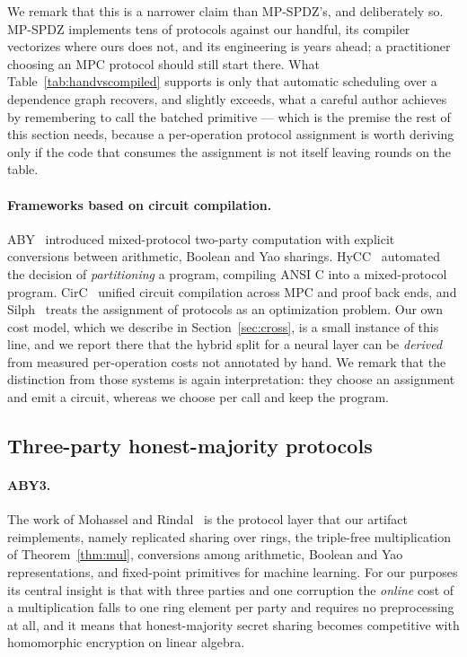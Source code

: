\documentclass[11pt]{article}
\begin{document}
We remark that this is a narrower claim than MP-SPDZ's, and deliberately so. MP-SPDZ implements
tens of protocols against our handful, its compiler vectorizes where ours does not, and its
engineering is years ahead; a practitioner choosing an MPC protocol should still start there.
What Table~\ref{tab:handvscompiled} supports is only that automatic scheduling over a dependence
graph recovers, and slightly exceeds, what a careful author achieves by remembering to call the
batched primitive --- which is the premise the rest of this section needs, because a per-operation
protocol assignment is worth deriving only if the code that consumes the assignment is not itself
leaving rounds on the table.

\paragraph{Frameworks based on circuit compilation.} ABY~\cite{ABY} introduced
mixed-protocol two-party computation with explicit conversions between arithmetic, Boolean and
Yao sharings. HyCC~\cite{HyCC} automated the decision of \emph{partitioning} a program,
compiling ANSI C into a mixed-protocol program. CirC~\cite{CirC} unified circuit compilation
across MPC and proof back ends, and Silph~\cite{Silph} treats the assignment of protocols as an
optimization problem. Our own cost model, which we describe in Section~\ref{sec:cross}, is a
small instance of this line, and we report there that the hybrid split for a neural layer can be
\emph{derived} from measured per-operation costs not annotated by hand. We remark that
the distinction from those systems is again interpretation: they choose an assignment and emit a
circuit, whereas we choose per call and keep the program.

\subsection{Three-party honest-majority protocols}
\label{sec:related:3pc}

\paragraph{ABY3.} The work of Mohassel and Rindal~\cite{ABY3} is the protocol layer that our
artifact reimplements, namely replicated sharing over rings, the triple-free multiplication of
Theorem~\ref{thm:mul}, conversions among arithmetic, Boolean and Yao representations, and
fixed-point primitives for machine learning. For our purposes its central insight is that with
three parties and one corruption the \emph{online} cost of a multiplication falls to one ring
element per party and requires no preprocessing at all, and it means that honest-majority secret
sharing becomes competitive with homomorphic encryption on linear algebra.
\end{document}
